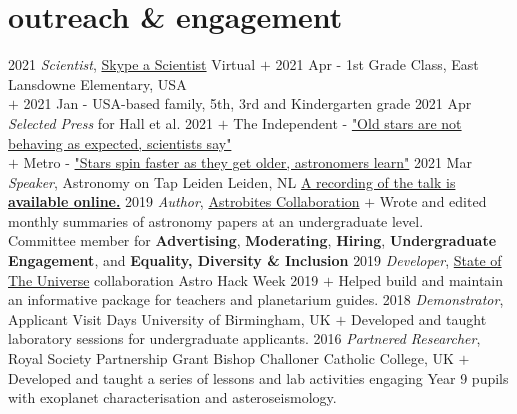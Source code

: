 \documentclass[letterpaper]{k-cv} %
\begin{document}
\section{\color{c1}outreach \& engagement}
\begin{entrylist}
	\centry
	{2021}
	{\emph{Scientist}, \href{https://www.skypeascientist.com/}{Skype a Scientist}}
	{Virtual}
	{$+$ 2021 Apr - 1st Grade Class, East Lansdowne Elementary, USA\\
		$+$ 2021 Jan - USA-based family, 5th, 3rd and Kindergarten grade
	 }
	\centry
	{2021 Apr}
	{\emph{Selected Press} for \textcolor{c1}{Hall et al. 2021}}
	{}
	{$+$ The Independent - \href{https://www.independent.co.uk/life-style/gadgets-and-tech/star-spinning-astronomy-seismology-b1835897.html}{"Old stars are not behaving as expected, scientists say"}\\
	$+$ Metro - \href{https://metro.co.uk/2021/04/22/stars-spin-faster-as-they-get-older-astronomers-learn-14453841/}{"Stars spin faster as they get older, astronomers learn"}
	} 
	\centry
	{2021 Mar}
	{\emph{Speaker}, Astronomy on Tap Leiden}
	{Leiden, NL}
	{\href{https://youtu.be/lreGHVBKfjo?t=1925}{A recording of the talk is \textbf{\textcolor{c1}{available online.}}}}	
	\centry
	{2019 }
	{\emph{Author}, \href{https://astrobites.org/}{Astrobites Collaboration}}
	{}
	{$+$ Wrote and edited monthly summaries of astronomy papers at an undergraduate level. \\ Committee member for \textbf{\textcolor{c1}{Advertising}}, \textbf{\textcolor{c1}{Moderating}}, \textbf{\textcolor{c1}{Hiring}}, \textbf{\textcolor{c1}{Undergraduate Engagement}}, and \textbf{\textcolor{c1}{Equality, Diversity \& Inclusion}}}
	\centry
	{2019}
	{\emph{Developer}, \href{https://github.com/ojhall94/stateoftheuniverse}{State of The Universe} collaboration}
	{Astro Hack Week 2019}
	{$+$ Helped build and maintain an informative package for teachers and planetarium guides.}
	\centry
	{2018 }
	{\emph{Demonstrator}, Applicant Visit Days}
	{University of Birmingham, UK}
	{$+$ Developed and taught laboratory sessions for undergraduate applicants.}
	\centry
	{2016 }
	{\emph{Partnered Researcher}, \textcolor{c1}{Royal Society Partnership Grant}}
	{Bishop Challoner Catholic College, UK}
	{$+$ Developed and taught a series of lessons and lab activities engaging Year 9 pupils with exoplanet characterisation and asteroseismology.}
\end{entrylist}
\end{document}
